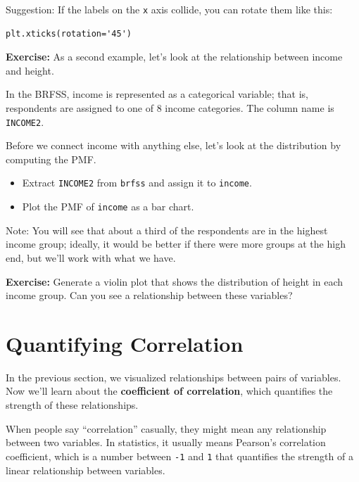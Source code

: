Suggestion: If the labels on the \passthrough{\lstinline!x!} axis
collide, you can rotate them like this:

\begin{lstlisting}
plt.xticks(rotation='45')
\end{lstlisting}

\textbf{Exercise:} As a second example, let's look at the relationship
between income and height.

In the BRFSS, income is represented as a categorical variable; that is,
respondents are assigned to one of 8 income categories. The column name
is \passthrough{\lstinline!INCOME2!}.

Before we connect income with anything else, let's look at the
distribution by computing the PMF.

\begin{itemize}
\item
  Extract \passthrough{\lstinline!INCOME2!} from
  \passthrough{\lstinline!brfss!} and assign it to
  \passthrough{\lstinline!income!}.
\item
  Plot the PMF of \passthrough{\lstinline!income!} as a bar chart.
\end{itemize}

Note: You will see that about a third of the respondents are in the
highest income group; ideally, it would be better if there were more
groups at the high end, but we'll work with what we have.

\textbf{Exercise:} Generate a violin plot that shows the distribution of
height in each income group. Can you see a relationship between these
variables?

\hypertarget{quantifying-correlation}{%
\section{Quantifying Correlation}\label{quantifying-correlation}}

In the previous section, we visualized relationships between pairs of
variables. Now we'll learn about the \textbf{coefficient of
correlation}, which quantifies the strength of these relationships.

When people say ``correlation'' casually, they might mean any
relationship between two variables. In statistics, it usually means
Pearson's correlation coefficient, which is a number between
\passthrough{\lstinline!-1!} and \passthrough{\lstinline!1!} that
quantifies the strength of a linear relationship between variables.

